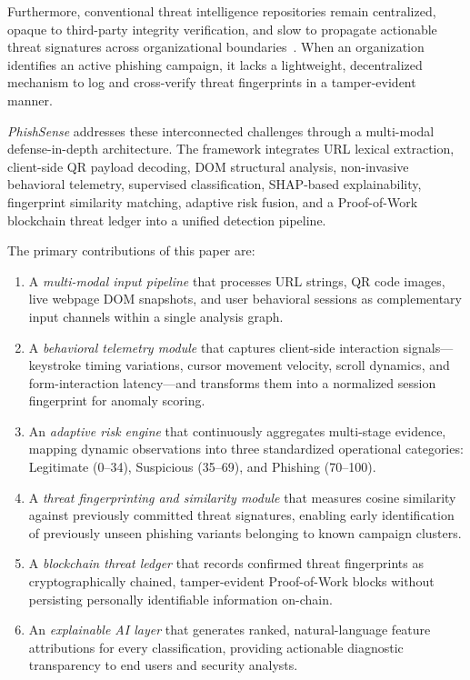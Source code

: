 \documentclass[conference]{IEEEtran}
\begin{document}
Furthermore, conventional threat intelligence repositories remain centralized, opaque to third-party
integrity verification, and slow to propagate actionable threat signatures across organizational
boundaries~\cite{ref11}.
When an organization identifies an active phishing campaign, it lacks a lightweight, decentralized
mechanism to log and cross-verify threat fingerprints in a tamper-evident manner.

\textit{PhishSense} addresses these interconnected challenges through a multi-modal defense-in-depth
architecture.
The framework integrates URL lexical extraction, client-side QR payload decoding, DOM structural
analysis, non-invasive behavioral telemetry, supervised classification, SHAP-based explainability,
fingerprint similarity matching, adaptive risk fusion, and a Proof-of-Work blockchain threat ledger
into a unified detection pipeline.

The primary contributions of this paper are:
\begin{enumerate}[leftmargin=*,nosep]
\item A \textit{multi-modal input pipeline} that processes URL strings, QR code images, live webpage
      DOM snapshots, and user behavioral sessions as complementary input channels within a single
      analysis graph.
\item A \textit{behavioral telemetry module} that captures client-side interaction signals---keystroke
      timing variations, cursor movement velocity, scroll dynamics, and form-interaction
      latency---and transforms them into a normalized session fingerprint for anomaly scoring.
\item An \textit{adaptive risk engine} that continuously aggregates multi-stage evidence, mapping
      dynamic observations into three standardized operational categories: Legitimate (0--34),
      Suspicious (35--69), and Phishing (70--100).
\item A \textit{threat fingerprinting and similarity module} that measures cosine similarity against
      previously committed threat signatures, enabling early identification of previously unseen
      phishing variants belonging to known campaign clusters.
\item A \textit{blockchain threat ledger} that records confirmed threat fingerprints as
      cryptographically chained, tamper-evident Proof-of-Work blocks without persisting personally
      identifiable information on-chain.
\item An \textit{explainable AI layer} that generates ranked, natural-language feature attributions
      for every classification, providing actionable diagnostic transparency to end users and
      security analysts.
\end{enumerate}
\end{document}
